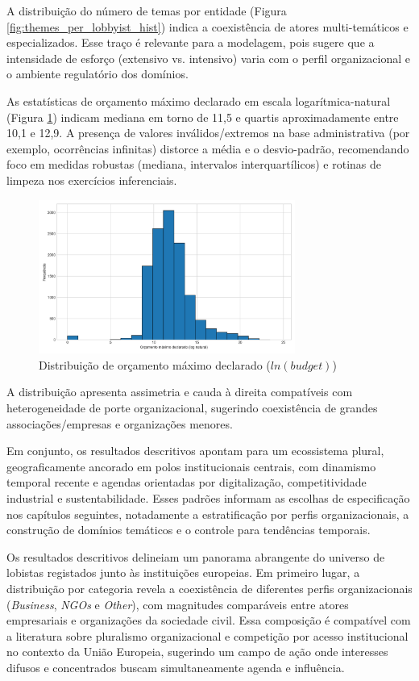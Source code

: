 A distribuição do número de temas por entidade (Figura \ref{fig:themes_per_lobbyist_hist}) indica a coexistência de atores multi-temáticos e especializados. Esse traço é relevante para a modelagem, pois sugere que a intensidade de esforço (extensivo vs. intensivo) varia com o perfil organizacional e o ambiente regulatório dos domínios.


As estatísticas de orçamento máximo declarado em escala logarítmica-natural (Figura \ref{fig:budget_ln_hist}) indicam mediana em torno de 11,5 e quartis aproximadamente entre 10,1 e 12,9. A presença de valores inválidos/extremos na base administrativa (por exemplo, ocorrências infinitas) distorce a média e o desvio-padrão, recomendando foco em medidas robustas (mediana, intervalos interquartílicos) e rotinas de limpeza nos exercícios inferenciais.

\begin{figure}[!htbp]
\centering
\includegraphics[width=0.75\textwidth]{figures/budget_ln_hist.png}
\caption{Distribuição de orçamento máximo declarado ($ln(budget)$)}
\label{fig:budget_ln_hist}
\end{figure}

A distribuição apresenta assimetria e cauda à direita compatíveis com heterogeneidade de porte organizacional, sugerindo coexistência de grandes associações/empresas e organizações menores.


Em conjunto, os resultados descritivos apontam para um ecossistema plural, geograficamente ancorado em polos institucionais centrais, com dinamismo temporal recente e agendas orientadas por digitalização, competitividade industrial e sustentabilidade. Esses padrões informam as escolhas de especificação nos capítulos seguintes, notadamente a estratificação por perfis organizacionais, a construção de domínios temáticos e o controle para tendências temporais.


Os resultados descritivos delineiam um panorama abrangente do universo de lobistas registados junto às instituições europeias. Em primeiro lugar, a distribuição por categoria revela a coexistência de diferentes perfis organizacionais (\textit{Business}, \textit{NGOs} e \textit{Other}), com magnitudes comparáveis entre atores empresariais e organizações da sociedade civil. Essa composição é compatível com a literatura sobre pluralismo organizacional e competição por acesso institucional no contexto da União Europeia, sugerindo um campo de ação onde interesses difusos e concentrados buscam simultaneamente agenda e influência.

